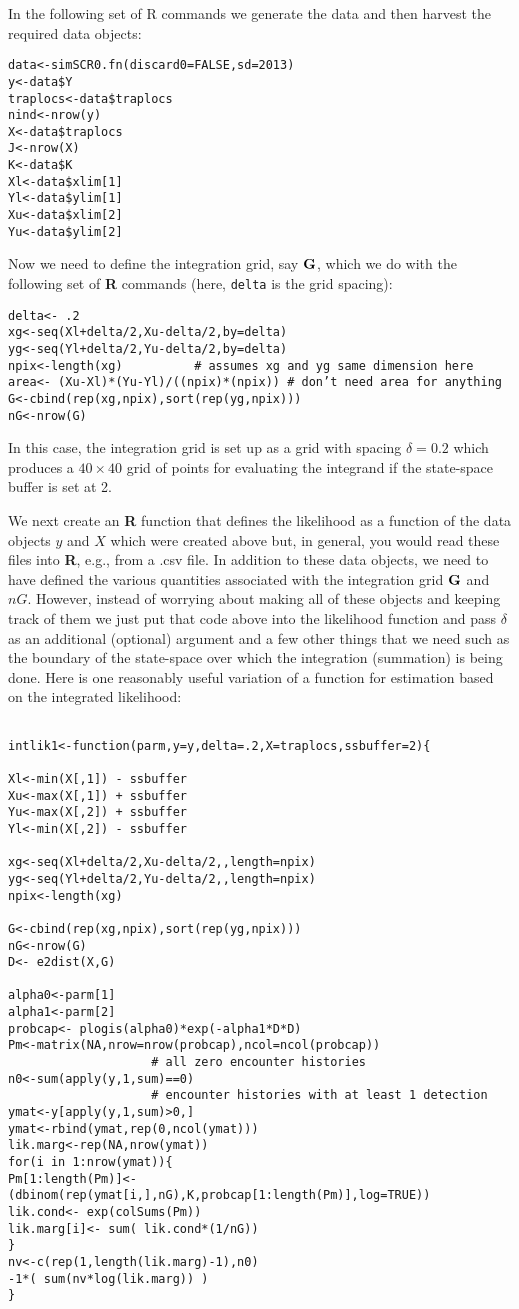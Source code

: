 In the following set of R commands we generate the data and 
then harvest the required data objects:
\begin{verbatim}
data<-simSCR0.fn(discard0=FALSE,sd=2013)
y<-data$Y
traplocs<-data$traplocs
nind<-nrow(y)
X<-data$traplocs
J<-nrow(X)
K<-data$K
Xl<-data$xlim[1]
Yl<-data$ylim[1]
Xu<-data$xlim[2]
Yu<-data$ylim[2]
\end{verbatim}
Now we need to define the integration grid, say ${\bf G}$, which we do with
the following set of {\bf R} commands (here, \mbox{\tt delta} is the grid spacing):
\begin{verbatim}
delta<- .2
xg<-seq(Xl+delta/2,Xu-delta/2,by=delta) 
yg<-seq(Yl+delta/2,Yu-delta/2,by=delta) 
npix<-length(xg)          # assumes xg and yg same dimension here
area<- (Xu-Xl)*(Yu-Yl)/((npix)*(npix)) # don’t need area for anything
G<-cbind(rep(xg,npix),sort(rep(yg,npix)))
nG<-nrow(G)
\end{verbatim}
In this case, the integration grid is set up as a grid with spacing
$\delta = 0.2$ which produces a $40 \times 40$ grid of points for evaluating the
integrand if the state-space buffer is set at 2.

We next create an {\bf R} function that defines the likelihood as a function
of the data objects $y$ and $X$ which were created above but, in general,
you would read these files into {\bf R}, e.g., from a .csv file.
In addition to these data
objects, we need to have defined the various quantities associated
with the integration grid ${\bf G}$ and $nG$.
However, instead of worrying about making all of these objects and
keeping track of them we just put that code above into the likelihood
function and pass $\delta$ as an additional (optional) argument and a
few other things that we need such as the boundary of the state-space
over which the integration (summation) is being done.
Here is one reasonably useful variation of a function for estimation
based on the integrated likelihood:

{\small 
\begin{verbatim}

intlik1<-function(parm,y=y,delta=.2,X=traplocs,ssbuffer=2){

Xl<-min(X[,1]) - ssbuffer 
Xu<-max(X[,1]) + ssbuffer
Yu<-max(X[,2]) + ssbuffer
Yl<-min(X[,2]) - ssbuffer

xg<-seq(Xl+delta/2,Xu-delta/2,,length=npix) 
yg<-seq(Yl+delta/2,Yu-delta/2,,length=npix) 
npix<-length(xg)

G<-cbind(rep(xg,npix),sort(rep(yg,npix)))
nG<-nrow(G)
D<- e2dist(X,G)  

alpha0<-parm[1]
alpha1<-parm[2]
probcap<- plogis(alpha0)*exp(-alpha1*D*D)
Pm<-matrix(NA,nrow=nrow(probcap),ncol=ncol(probcap))
                    # all zero encounter histories
n0<-sum(apply(y,1,sum)==0) 
                    # encounter histories with at least 1 detection
ymat<-y[apply(y,1,sum)>0,] 
ymat<-rbind(ymat,rep(0,ncol(ymat)))
lik.marg<-rep(NA,nrow(ymat))
for(i in 1:nrow(ymat)){
Pm[1:length(Pm)]<- (dbinom(rep(ymat[i,],nG),K,probcap[1:length(Pm)],log=TRUE))
lik.cond<- exp(colSums(Pm))
lik.marg[i]<- sum( lik.cond*(1/nG))  
}
nv<-c(rep(1,length(lik.marg)-1),n0)
-1*( sum(nv*log(lik.marg)) )
}
\end{verbatim}
}


